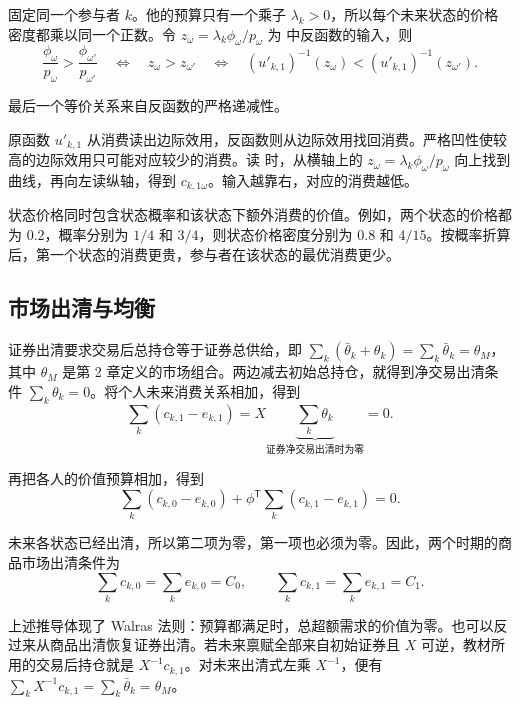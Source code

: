\begin{solution}[label-content={证明},blank-type=none]
固定同一个参与者 $k$。他的预算只有一个乘子 $\lambda_k>0$，所以每个未来状态的价格密度都乘以同一个正数。令 $z_\omega=\lambda_k\phi_\omega/p_\omega$ 为 中反函数的输入，则
\[
 \frac{\phi_\omega}{p_\omega}>\frac{\phi_{\omega'}}{p_{\omega'}}
 \quad\Longleftrightarrow\quad z_\omega>z_{\omega'}
 \quad\Longleftrightarrow\quad
 (u'_{k,1})^{-1}(z_\omega)<(u'_{k,1})^{-1}(z_{\omega'}).
\]

最后一个等价关系来自反函数的严格递减性。
\end{solution}

原函数 $u'_{k,1}$ 从消费读出边际效用，反函数则从边际效用找回消费。严格凹性使较高的边际效用只可能对应较少的消费。读 时，从横轴上的 $z_\omega=\lambda_k\phi_\omega/p_\omega$ 向上找到曲线，再向左读纵轴，得到 $c_{k,1\omega}$。输入越靠右，对应的消费越低。

\begingroup
\renewcommand{\thewjFigure}{\thechapter.S\arabic{wjFigure}}%
\endgroup

状态价格同时包含状态概率和该状态下额外消费的价值。例如，两个状态的价格都为 $0.2$，概率分别为 $1/4$ 和 $3/4$，则状态价格密度分别为 $0.8$ 和 $4/15$。按概率折算后，第一个状态的消费更贵，参与者在该状态的最优消费更少。

\subsection{市场出清与均衡}
证券出清要求交易后总持仓等于证券总供给，即 $\sum_k(\bar\theta_k+\theta_k)=\sum_k\bar\theta_k=\theta_M$，其中 $\theta_M$ 是第 2 章定义的市场组合。两边减去初始总持仓，就得到净交易出清条件 $\sum_k\theta_k=0$。将个人未来消费关系相加，得到
\[
 \sum_k(c_{k,1}-e_{k,1})
 =X\underbrace{\sum_k\theta_k}_{\text{证券净交易出清时为零}}=0.
\]

再把各人的价值预算相加，得到
\[
 \sum_k(c_{k,0}-e_{k,0})
 +\phi^{\mathsf T}\sum_k(c_{k,1}-e_{k,1})=0.
\]

未来各状态已经出清，所以第二项为零，第一项也必须为零。因此，两个时期的商品市场出清条件为
\begin{equation}
 \sum_k c_{k,0}=\sum_k e_{k,0}=C_0,\qquad
 \sum_k c_{k,1}=\sum_k e_{k,1}=C_1.
 \label{eq:wj-10-6}
\end{equation}

上述推导体现了 Walras 法则：预算都满足时，总超额需求的价值为零。也可以反过来从商品出清恢复证券出清。若未来禀赋全部来自初始证券且 $X$ 可逆，教材所用的交易后持仓就是 $X^{-1}c_{k,1}$。对未来出清式左乘 $X^{-1}$，便有 $\sum_k X^{-1}c_{k,1}=\sum_k\bar\theta_k=\theta_M$。

